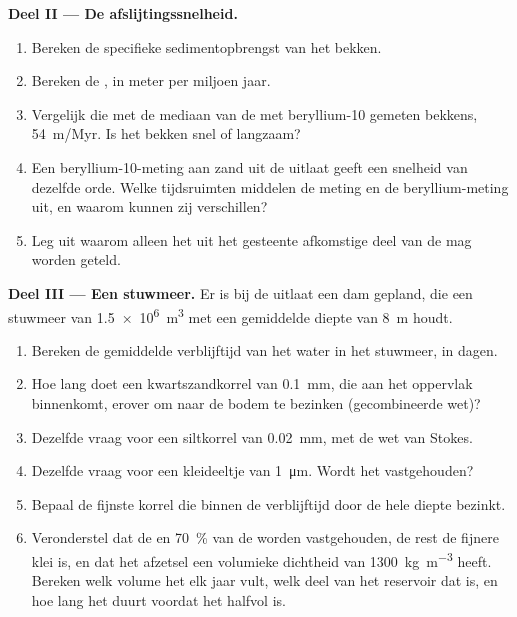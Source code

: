\begin{problem}
\medskip
\noindent\textbf{Deel II --- De afslijtingssnelheid.}
\begin{enumerate}[resume]
  \item Bereken de specifieke sedimentopbrengst van het bekken.
  \item Bereken de , in meter per miljoen jaar.
  \item Vergelijk die met de mediaan van de met beryllium-10 gemeten bekkens, \qty{54}{m/Myr}. Is het bekken snel of langzaam?
  \item Een beryllium-10-meting aan zand uit de uitlaat geeft een snelheid van dezelfde orde. Welke tijdsruimten middelen de meting en de beryllium-meting uit, en waarom kunnen zij verschillen?
  \item Leg uit waarom alleen het uit het gesteente afkomstige deel van de  mag worden geteld.
\end{enumerate}

\medskip
\noindent\textbf{Deel III --- Een stuwmeer.}
Er is bij de uitlaat een dam gepland, die een stuwmeer van \qty{1.5e6}{m^3} met een gemiddelde diepte van \qty{8}{m} houdt.
\begin{enumerate}[resume]
  \item Bereken de gemiddelde verblijftijd van het water in het stuwmeer, in dagen.
  \item Hoe lang doet een kwartszandkorrel van \qty{0.1}{mm}, die aan het oppervlak binnenkomt, erover om naar de bodem te bezinken (gecombineerde wet)?
  \item Dezelfde vraag voor een siltkorrel van \qty{0.02}{mm}, met de wet van Stokes.
  \item Dezelfde vraag voor een kleideeltje van \qty{1}{\micro m}. Wordt het vastgehouden?
  \item Bepaal de fijnste korrel die binnen de verblijftijd door de hele diepte bezinkt.
  \item Veronderstel dat de  en \qty{70}{\percent} van de  worden vastgehouden, de rest de fijnere klei is, en dat het afzetsel een volumieke dichtheid van \qty{1300}{kg.m^{-3}} heeft. Bereken welk volume het elk jaar vult, welk deel van het reservoir dat is, en hoe lang het duurt voordat het halfvol is.
\end{enumerate}


\end{problem}
